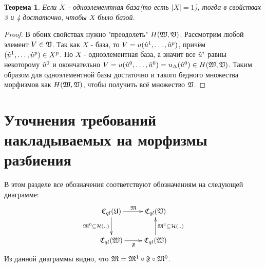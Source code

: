 \documentclass[a4paper, 12pt]{report}
\newtheorem{theorem}{Теорема}
\begin{document}
\begin{theorem}
Если $X$ - одноэлементная база(то есть $|X|=1$), тогда в свойствах 3 и 4 достаточно, чтобы $X$ было базой.
\end{theorem}
\begin{proof}
В обоих свойствах нужно "преодолеть" $H(\mathfrak{W}, \mathfrak{V})$. Рассмотрим любой элемент $V\in\mathfrak{V}$. Так как $X$ - база, то $V=u(\hat{u}^1,\ldots,\hat{u}^p)$, причём $(\hat{u}^1,\ldots,\hat{u}^p)\in X^p$. Но $X$ - одноэлементная база, а значит все $\hat{u}^i$ равны некоторому $\hat{u}^0$ и окончательно $V = u(\hat{u}^0,\ldots,\hat{u}^0) = u_{\Delta}(\hat{u}^0) \in H(\mathfrak{W}, \mathfrak{V})$. Таким образом для одноэлементной базы достаточно и такого бедного множества морфизмов как $H(\mathfrak{W}, \mathfrak{V})$, чтобы получить всё множество $\mathfrak{V}$.
\end{proof}

\section{Уточнения требований накладываемых на морфизмы разбиения}
В этом разделе все обозначения соответствуют обозначениям на следующей диаграмме:
\begin{equation*}
\xymatrix{
\Cql(\frakU)\ar[r]^\frakM\ar[d]_{\frakM^0 \subseteq \calH(..)} & \Cql(\frakV)\\
\Cql(\frakW)\ar[r]_{\mathfrak{F}} & \Cql(\frakW)\ar[u]_{\frakM^1 \subseteq \calH(..)}
}
\end{equation*}
Из данной диаграммы видно, что $\mathfrak{M} = \mathfrak{M}^1\circ\mathfrak{F}\circ\mathfrak{M}^0$.\\
\end{document}
